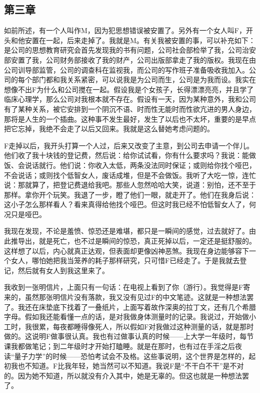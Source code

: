 \subsection{第三章}

如前所述，有一个人叫作M，因为犯思想错误被安置了。另外有一个女人叫F，开头和他安置在一起，后来走掉了。我就是M。有关我被安置的事，可以补充如下：是公司的思想教育研究会首先发现我的书有问题，公司社会部检举了我，公司治安部安置了我，公司财务部接收了我的财产，公司出版部拿走了我的版权。我现在由公司训导部监管，公司的调查科在监视我，而公司的写作班子准备吸收我加入。公司的每个部门都和我关系紧密，可以说我是为公司而生，公司是为我而设。我实在想像不出F为什么和公司搅在一起。假设我是个女孩子，长得漂漂亮亮，并且学了临床心理学，那么公司对我根本就不存在。假设有一天，因为某种意外，我和公司有了某种关系，被它安排到一个阴沉不语、时而性无能时而性欲亢进的男人身边，那将是人生的一个插曲。这种事不发生最好，发生了以后也不太坏，重要的是早点把它忘掉，我绝不会走了以后又回来。我就是这么替她考虑问题的。 

F走掉以后，我开头打算一个人过，后来又改变了主意，到公司去申请一个伴儿。他们收了我十块钱的登记费，然后说：给你试试看，你有什么要求吗？我说：能做饭、会说话就行。他们说：你收入太低，两条没法同时保证；或则给你找个哑巴，不会说话；或则找个低智女人，废话成堆，但是不会做饭。我听了大吃一惊，连忙说：那就算了，把登记费退给我吧。那些人忽然哈哈大笑，说道：别怕，还不至于那样。拿你开个玩笑。我退了一步，瞪了他们一眼，就走开了。他们在我身后说：这小子怎么那样看人？看来真得给他找个哑巴。但这时我已经不怕低智女人了，何况只是哑巴。 

我现在发现，不论是羞愤、惊恐还是难堪，都只是一瞬间的感觉，过去就好了。由此推导出，就是死亡，也不过是瞬间的惊恐，真正死掉以后，一定还是挺舒服的。这样想了以后，内心就真正达观，但表面却更像凶神恶煞。我现在身边能够容下一个女人，哪怕她把我当笼养的耗子那样研究，只可惜F已经走了。于是我就去登记，然后就有女人到我这里来了。 

我收到一张明信片，上面只有一句话：在电视上看到了你（游行）。我觉得是F寄来的，虽然那张明信片没有落款，我又没有见过F的中文笔迹。这就是一种想法罢了。我还在床垫底下找着了一叠纸片，上面写着故作深奥的拉丁文，还有几个希腊字母。假如我还能看懂一点的话，是对我做身体测量时的记录。我说过，开始做小工时，我很累，每夜都睡得像死人，所以假如F对我做过这种测量的话，就是那时做的。这说明F做事很认真。我也有过做事认真的时候——上大学一年级时，每节课我都做笔记；到二年级时才开始打瞌睡。就是在那时，也有过在手淫之后夜读“量子力学”的时候——恐怕考试会不及格。这些事说明，这个世界是怎样的，起初我也不知道。F比我年轻，她当然可以不知道。我说F是“不干白不干”是不对的。因为她不知道，所以就没有介入其中，她是无辜的。但这也就是一种想法罢了。 

